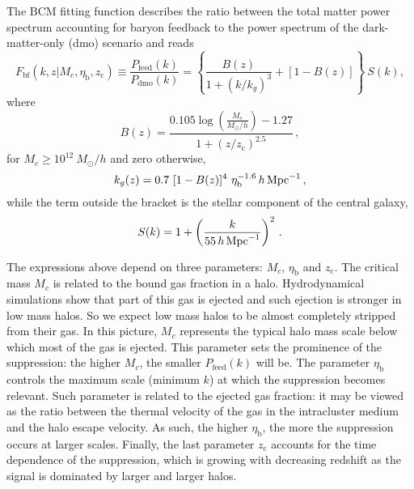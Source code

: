 \documentclass[a4paper,11pt]{article}
\def\kMpc{\, h \, {\rm Mpc}^{-1}}
\begin{document}
{The BCM fitting function describes the ratio between the total matter power spectrum accounting for baryon feedback to the power spectrum of the dark-matter-only (dmo) scenario and reads
\begin{equation}
F_\mathrm{bf}(k, z|M_c, \eta_\mathrm b, z_\mathrm c) \equiv \frac{P_{\mathrm{feed}}(k)}{P_{\mathrm{dmo}}(k)} = \left\{\frac{B(z)}{1+(k/k_g)^3} + \left[1-B(z)\right]\right\} \ S(k),
\label{eq:feedback_function}
\end{equation}
where
\begin{equation}
B(z) = \frac{0.105 \log{\left(\frac{M_c}{\unit{M_\odot}/h}\right)} - 1.27}{1+(z/z_\mathrm c)^{2.5}} \,,
\label{eq:feedback_function_1}
\end{equation}
for  $M_c \geq 10^{12} \unit{\ M_\odot}/h$ and zero otherwise,
\begin{equation}
k_g(z) = 0.7 \ [1-B(z)]^4 \ \eta_\mathrm b^{-1.6} \kMpc\,,
\label{eq:feedback_function_2}
\end{equation}
while the term outside the bracket is the stellar component of the central galaxy,
\begin{equation}
S(k) = 1+\left(\frac{k}{55 \kMpc}\right)^2\,.
\label{eq:feedback_function_3}
\end{equation}

The expressions above depend on three parameters: $M_c$, $\eta_\mathrm b$ and $z_\mathrm c$. The critical mass $M_c$ is related to the bound gas fraction in a halo. Hydrodynamical simulations show that part of this gas is ejected and such ejection is stronger in low mass halos. So we expect low mass halos to be almost completely stripped from their gas.  In this picture, $M_c$ represents the typical halo mass scale below which most of the gas is ejected.
This parameter sets the prominence of the suppression: the higher $M_c$, the smaller $P_{\mathrm{feed}}(k)$ will be.
The parameter $\eta_\mathrm b$ controls the maximum scale (minimum $k$) at which the suppression becomes relevant.
Such parameter is related to the ejected gas fraction: it may be viewed as the ratio between the thermal velocity of the gas in the intracluster medium and the halo escape velocity. As such, the higher $\eta_\mathrm b$, the more the suppression occurs at larger scales.
Finally, the last parameter $z_\mathrm c$ accounts for the time dependence of the suppression, which is growing with decreasing redshift as the signal is dominated by larger and larger halos.

}
\end{document}
